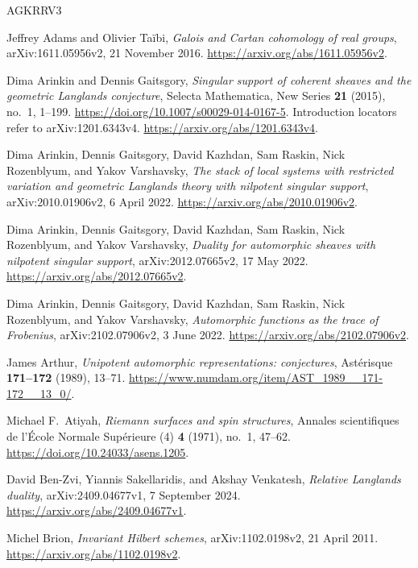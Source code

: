 \begin{thebibliography}{AGKRRV3}

Jeffrey Adams and Olivier Ta\"ibi,
\emph{Galois and Cartan cohomology of real groups},
arXiv:1611.05956v2, 21 November 2016.
\url{https://arxiv.org/abs/1611.05956v2}.

Dima Arinkin and Dennis Gaitsgory,
\emph{Singular support of coherent sheaves and the geometric Langlands
conjecture},
Selecta Mathematica, New Series \textbf{21} (2015), no.~1, 1--199.
\url{https://doi.org/10.1007/s00029-014-0167-5}.
Introduction locators refer to arXiv:1201.6343v4.
\url{https://arxiv.org/abs/1201.6343v4}.

Dima Arinkin, Dennis Gaitsgory, David Kazhdan, Sam Raskin,
Nick Rozenblyum, and Yakov Varshavsky,
\emph{The stack of local systems with restricted variation and geometric
Langlands theory with nilpotent singular support},
arXiv:2010.01906v2, 6 April 2022.
\url{https://arxiv.org/abs/2010.01906v2}.

Dima Arinkin, Dennis Gaitsgory, David Kazhdan, Sam Raskin,
Nick Rozenblyum, and Yakov Varshavsky,
\emph{Duality for automorphic sheaves with nilpotent singular support},
arXiv:2012.07665v2, 17 May 2022.
\url{https://arxiv.org/abs/2012.07665v2}.

Dima Arinkin, Dennis Gaitsgory, David Kazhdan, Sam Raskin,
Nick Rozenblyum, and Yakov Varshavsky,
\emph{Automorphic functions as the trace of Frobenius},
arXiv:2102.07906v2, 3 June 2022.
\url{https://arxiv.org/abs/2102.07906v2}.

James Arthur,
\emph{Unipotent automorphic representations: conjectures},
Ast\'erisque \textbf{171--172} (1989), 13--71.
\url{https://www.numdam.org/item/AST_1989__171-172__13_0/}.

Michael F.~Atiyah,
\emph{Riemann surfaces and spin structures},
Annales scientifiques de l'\'Ecole Normale Sup\'erieure (4)
\textbf{4} (1971), no.~1, 47--62.
\url{https://doi.org/10.24033/asens.1205}.

David Ben-Zvi, Yiannis Sakellaridis, and Akshay Venkatesh,
\emph{Relative Langlands duality},
arXiv:2409.04677v1, 7 September 2024.
\url{https://arxiv.org/abs/2409.04677v1}.

Michel Brion,
\emph{Invariant Hilbert schemes},
arXiv:1102.0198v2, 21 April 2011.
\url{https://arxiv.org/abs/1102.0198v2}.


\end{thebibliography}
